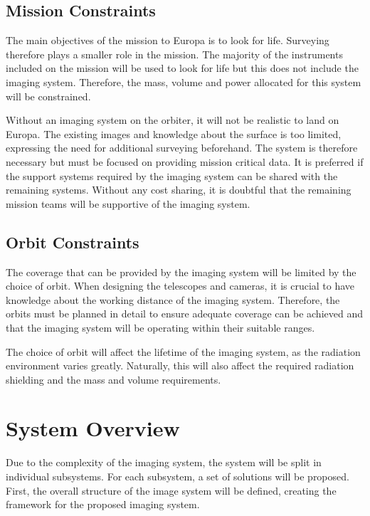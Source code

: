 \subsection{Mission Constraints}
The main objectives of the mission to Europa is to look for life. Surveying therefore plays a smaller role in the mission. The majority of the instruments included on the mission will be used to look for life but this does not include the imaging system. Therefore, the mass, volume and power allocated for this system will be constrained.

Without an imaging system on the orbiter, it will not be realistic to land on Europa. The existing images and knowledge about the surface is too limited, expressing the need for additional surveying beforehand. The system is therefore necessary but must be focused on providing mission critical data. It is preferred if the support systems required by the imaging system can be shared with the remaining systems. Without any cost sharing, it is doubtful that the remaining mission teams will be supportive of the imaging system.
\subsection{Orbit Constraints}
The coverage that can be provided by the imaging system will be limited by the choice of orbit. When designing the telescopes and cameras, it is crucial to have knowledge about the working distance of the imaging system. Therefore, the orbits must be planned in detail to ensure adequate coverage can be achieved and that the imaging system will be operating within their suitable ranges.

The choice of orbit will affect the lifetime of the imaging system, as the radiation environment varies greatly. Naturally, this will also affect the required radiation shielding and the mass and volume requirements.
\section{System Overview}
Due to the complexity of the imaging system, the system will be split in individual subsystems. For each subsystem, a set of solutions will be proposed. First, the overall structure of the image system will be defined, creating the framework for the proposed imaging system.
